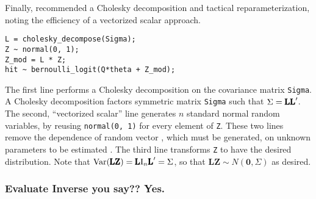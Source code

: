 \documentclass{article}
\begin{document}
Finally, \cite{Carpenter} recommended a Cholesky decomposition and tactical reparameterization, noting the efficiency of a vectorized scalar approach.
\begin{verbatim}
L = cholesky_decompose(Sigma);  
Z ~ normal(0, 1);  
Z_mod = L * Z; 
hit ~ bernoulli_logit(Q*theta + Z_mod);
\end{verbatim}
The first line performs a Cholesky decomposition on the covariance matrix \verb|Sigma|. A Cholesky decomposition factors symmetric matrix \verb|Sigma| such that $\Sigma = \text{\pmb{LL}}'$. The second, ``vectorized scalar'' line generates $n$ standard normal random variables, by reusing \verb|normal(0, 1)| for every element of \verb|Z|. These two lines remove the dependence of random vector , which must be generated, on unknown parameters to be estimated \cite{Trangucci2017}. The third line transforms \verb|Z| to have the desired distribution. Note that $\text{Var}(\text{\pmb{LZ}}) = \text{\pmb{L}} \text{I}_{n}\text{\pmb{L}}' = \Sigma$, so that $\pmb{LZ} \sim N(\pmb{0}, \Sigma)$ as desired.


\subsubsection*{Evaluate Inverse you say?? Yes.}
\end{document}

